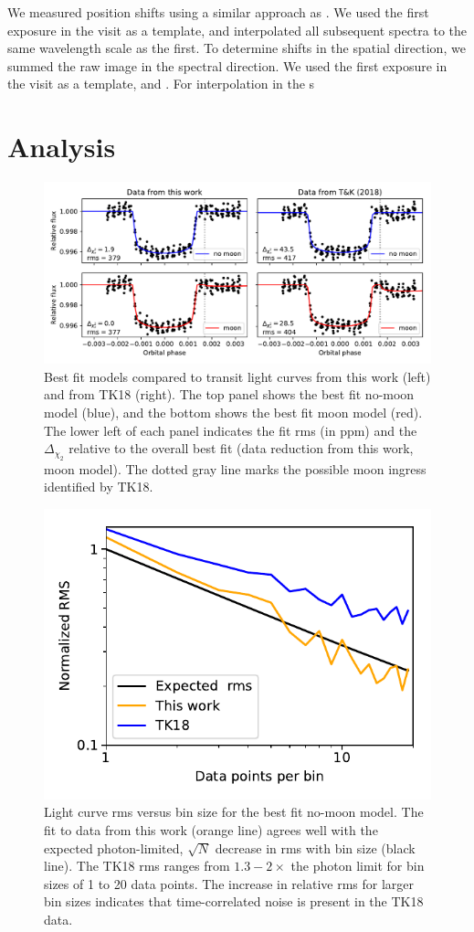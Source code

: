 \documentclass[twocolumn]{aastex62}
\begin{document}
We measured position shifts using a similar approach as \cite{deming12}. We used the first exposure in the visit as a template, and interpolated all subsequent spectra to the same wavelength scale as the first. To determine shifts in the spatial direction, we summed the raw image in the spectral direction. We used the first exposure in the visit as a template, and  . For interpolation in the s

\section{Analysis}
\begin{figure}
\includegraphics[width = 1.0 \textwidth]{figures/fig3_bestfits.pdf}
    \caption{Best fit models compared to transit light curves from this work (left) and from TK18 (right). The top panel shows the best fit no-moon model (blue), and the bottom shows the best fit moon model (red). The lower left of each panel indicates the fit rms (in ppm) and the $\Delta_{\chi_2}$ relative to the overall best fit (data reduction from this work, moon model). The dotted gray line marks the possible moon ingress identified by TK18.}
\label{fig:bestfit}
\end{figure}

\begin{figure}
\includegraphics[width = 0.5 \textwidth]{figures/fig2_rms.pdf}
    \caption{Light curve rms versus bin size for the best fit no-moon model. The fit to data from this work (orange line) agrees well with the expected photon-limited, $\sqrt{N}$ decrease in rms with bin size (black line). The TK18 rms ranges from $1.3 - 2\times$ the photon limit for bin sizes of 1 to 20 data points. The increase in relative rms for larger bin sizes indicates that time-correlated noise is present in the TK18 data.}
\label{fig:rms}
\end{figure}
\end{document}
